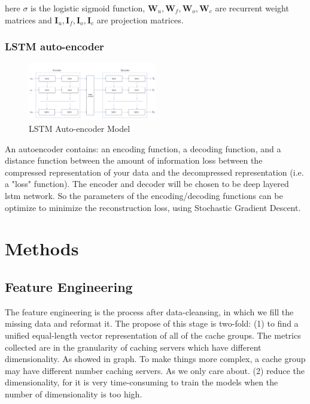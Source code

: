 \documentclass[5p]{elsarticle}
\begin{document}
here $\sigma$ is the logistic sigmoid function, $\mathbf W_u, \mathbf W_f, \mathbf W_o, \mathbf W_c$ are recurrent weight matrices and $\mathbf I_u, \mathbf I_f, \mathbf I_o, \mathbf I_c$ are projection matrices.


\subsubsection{LSTM auto-encoder}
\cite{ChoLearningTranslation}
\begin{figure}[h]
    \centering
    \includegraphics[width=0.5\textwidth]{auto_encoder.png}
    \caption{LSTM Auto-encoder Model}
    \label{fig:RNN_encoder-decoder}
\end{figure}

An autoencoder contains: an encoding function, a decoding function, and a distance function between the amount of information loss between the compressed representation of your data and the decompressed representation (i.e. a "loss" function). The encoder and decoder will be chosen to be deep layered lstm network. So the parameters of the encoding/decoding functions can be optimize to minimize the reconstruction loss, using Stochastic Gradient Descent.  


\section{Methods}
\subsection{Feature Engineering}
The feature engineering is the process after data-cleansing, in which we fill the missing data and reformat it. The propose of this stage is two-fold:
(1) to find a unified equal-length vector representation of all of the cache groups. 
The metrics collected are in the granularity of caching servers which have different dimensionality. As showed in graph. To make things more complex, a cache group may have different number caching servers. As we only care about. 
(2) reduce the dimensionality, for it is very time-consuming to train the models when the number of dimensionality is too high.
\end{document}
